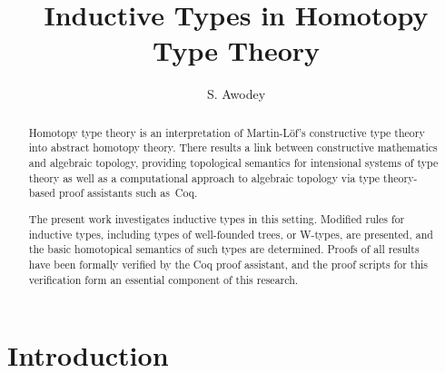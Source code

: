 \documentclass{article}
\theoremstyle{remark}
\theoremstyle{definition}
\begin{document}

\title{Inductive Types in Homotopy Type Theory}

\author{S. Awodey}

\maketitle

\begin{abstract}
Homotopy type theory is an interpretation of Martin-L\"of's constructive type theory into abstract homotopy theory.   There results a link between constructive mathematics and algebraic topology, providing topological semantics for intensional systems of type theory as well as a computational approach to algebraic topology via type theory-based proof assistants such as~Coq.

The present work investigates inductive types in this setting. Modified rules for inductive types, including types of well-founded trees, or W-types, are presented, and the basic homotopical semantics of such types are determined.  Proofs of all results have been formally verified by the Coq proof assistant, and the proof scripts for this verification form an essential component of this research.      
\end{abstract}



\section*{Introduction}
\end{document}
